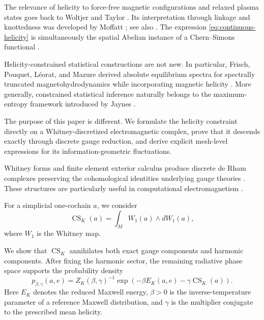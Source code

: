 \documentclass[11pt]{article}
\theoremstyle{definition}
\theoremstyle{remark}
\newcommand{\CS}{\operatorname{CS}}
\begin{document}
The relevance of helicity to force-free magnetic configurations
and relaxed plasma states goes back to Woltjer and Taylor
\cite{Woltjer1958,Taylor1974}. Its interpretation through
linkage and knottedness was developed by Moffatt
\cite{Moffatt1969}; see also \cite{ArnoldKhesin1998}.
The expression \eqref{eq:continuous-helicity} is simultaneously
the spatial Abelian instance of a Chern--Simons functional
\cite{ChernSimons1974}.

Helicity-constrained statistical constructions are not new.
In particular, Frisch, Pouquet, Léorat, and Mazure derived
absolute equilibrium spectra for spectrally truncated
magnetohydrodynamics while incorporating magnetic helicity
\cite{Frisch1975}. More generally, constrained statistical
inference naturally belongs to the maximum-entropy framework
introduced by Jaynes \cite{Jaynes1957,Jaynes1957b}.

The purpose of this paper is different. We formulate the
helicity constraint directly on a Whitney-discretized
electromagnetic complex, prove that it descends exactly through
discrete gauge reduction, and derive explicit mesh-level
expressions for its information-geometric fluctuations.

Whitney forms and finite element exterior calculus produce
discrete de Rham complexes preserving the cohomological
identities underlying gauge theories
\cite{ArnoldFalkWinther2006,ArnoldFalkWinther2010}.
These structures are particularly useful in computational
electromagnetism
\cite{Bossavit1998,Stern2015,Desbrun2005}.

For a simplicial one-cochain \(a\), we consider
\begin{equation}
\CS_K(a)
=
\int_M W_1(a)\wedge dW_1(a),
\label{eq:introduction-discrete-cs}
\end{equation}
where \(W_1\) is the Whitney map.

We show that \(\CS_K\) annihilates both exact gauge components
and harmonic components. After fixing the harmonic sector,
the remaining radiative phase space supports the probability
density
\begin{equation}
p_{\beta,\gamma}(a,e)
=
Z_K(\beta,\gamma)^{-1}
\exp\left(
-\beta E_K(a,e)
-\gamma\CS_K(a)
\right).
\label{eq:introduction-density}
\end{equation}
Here \(E_K\) denotes the reduced Maxwell energy, \(\beta>0\)
is the inverse-temperature parameter of a reference Maxwell
distribution, and \(\gamma\) is the multiplier conjugate to
the prescribed mean helicity.
\end{document}
